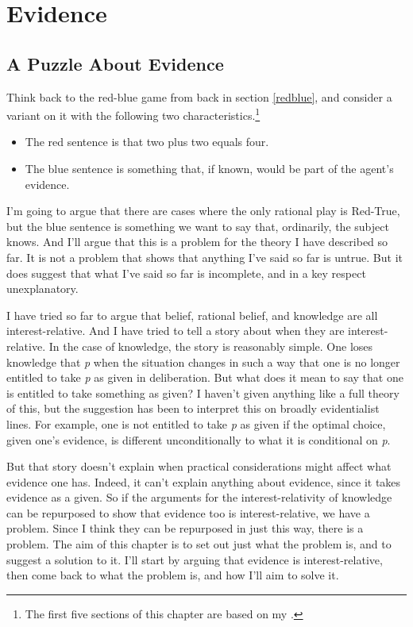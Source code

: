 \documentclass[
  11pt,
]{book}
\providecommand{\tightlist}{%
  \setlength{\itemsep}{0pt}\setlength{\parskip}{0pt}}
\begin{document}
\hypertarget{evidence}{%
\chapter{Evidence}\label{evidence}}

\hypertarget{evpuzzle}{%
\section{A Puzzle About Evidence}\label{evpuzzle}}

Think back to the red-blue game from back in section \ref{redblue}, and consider a variant on it with the following two characteristics.\footnote{The first five sections of this chapter are based on my \citeyearpar{Weatherson2018-WEAIEA-2}.}

\begin{itemize}
\tightlist
\item
  The red sentence is that two plus two equals four.
\item
  The blue sentence is something that, if known, would be part of the
  agent's evidence.
\end{itemize}

I'm going to argue that there are cases where the only rational play is Red-True, but the blue sentence is something we want to say that, ordinarily, the subject knows. And I'll argue that this is a problem for the theory I have described so far. It is not a problem that shows that anything I've said so far is untrue. But it does suggest that what I've said so far is incomplete, and in a key respect unexplanatory.

I have tried so far to argue that belief, rational belief, and knowledge are all interest-relative. And I have tried to tell a story about when they are interest-relative. In the case of knowledge, the story is reasonably simple. One loses knowledge that \emph{p} when the situation changes in such a way that one is no longer entitled to take \emph{p} as given in deliberation. But what does it mean to say that one is entitled to take something as given? I haven't given anything like a full theory of this, but the suggestion has been to interpret this on broadly evidentialist lines. For example, one is not entitled to take \emph{p} as given if the optimal choice, given one's evidence, is different unconditionally to what it is conditional on \emph{p}.

But that story doesn't explain when practical considerations might affect what evidence one has. Indeed, it can't explain anything about evidence, since it takes evidence as a given. So if the arguments for the interest-relativity of knowledge can be repurposed to show that evidence too is interest-relative, we have a problem. Since I think they can be repurposed in just this way, there is a problem. The aim of this chapter is to set out just what the problem is, and to suggest a solution to it. I'll start by arguing that evidence is interest-relative, then come back to what the problem is, and how I'll aim to solve it.
\end{document}

